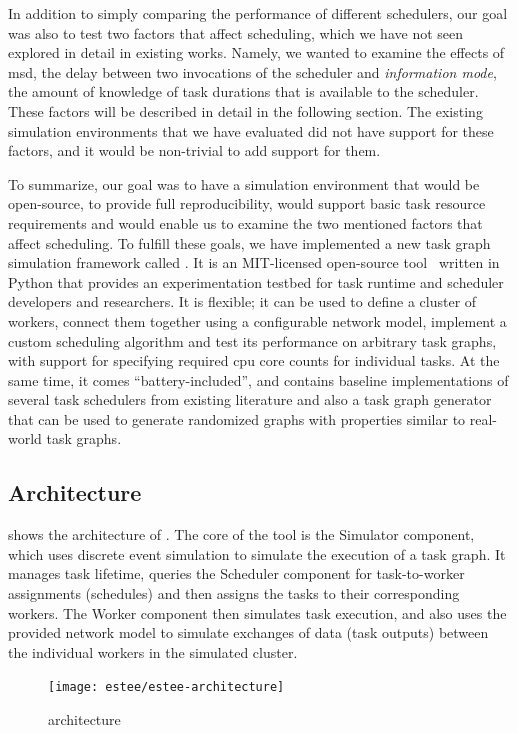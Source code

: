 In addition to simply comparing the performance of different schedulers, our goal was also to test
two factors that affect scheduling, which we have not seen explored in detail in existing works.
Namely, we wanted to examine the effects of \gls{msd}, the delay between two
invocations of the scheduler and \emph{information mode}, the amount of knowledge of task durations
that is available to the scheduler. These factors will be described in detail in the following
section. The existing simulation environments that we have evaluated did not have support for these
factors, and it would be non-trivial to add support for them.

To summarize, our goal was to have a simulation environment that would be open-source, to provide
full reproducibility, would support basic task resource requirements and would enable us to examine
the two mentioned factors that affect scheduling. To fulfill these goals, we have implemented a new
task graph simulation framework called \estee{}. It is an \mbox{MIT-licensed}
open-source tool~\cite{estee_github} written in Python that provides an experimentation testbed
for task runtime and scheduler developers and researchers. It is flexible; it can be used to define
a cluster of workers, connect them together using a configurable network model, implement a custom
scheduling algorithm and test its performance on arbitrary task graphs, with support for specifying
required \gls{cpu} core counts for individual tasks. At the same time, it comes
``battery-included'', and contains baseline implementations of several task schedulers from
existing literature and also a task graph generator that can be used to generate randomized graphs
with properties similar to real-world task graphs.

\subsection{Architecture}
 shows the architecture of \estee{}. The core of the
tool is the Simulator component, which uses discrete event simulation to simulate the execution of
a task graph. It manages task lifetime, queries the Scheduler component for task-to-worker
assignments (schedules) and then assigns the tasks to their corresponding workers. The Worker
component then simulates task execution, and also uses the provided network model to simulate
exchanges of data (task outputs) between the individual workers in the simulated cluster.

\begin{figure}
	\centering
	\texttt{[image: estee/estee-architecture]}
	\caption{\estee{} architecture}
	\label{fig:estee-architecture}
\end{figure}

